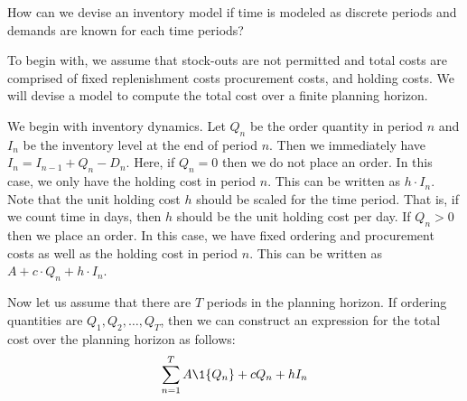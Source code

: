 \begin{exercise}
How can we devise an inventory model if time is modeled as discrete periods and demands are known for each time periods?


\begin{solution}
To begin with, we assume that stock-outs are not permitted and total costs are comprised of fixed replenishment costs procurement costs, and holding costs. We will devise a model to compute the total cost over a finite planning horizon.

We begin with inventory dynamics. Let $Q_n$ be the order quantity in period $n$ and $I_n$ be the inventory level at the end of period $n$. Then we immediately have $I_n=I_{n-1}+Q_n-D_n$. Here, if $Q_n=0$ then we do not place an order. In this case, we only have the holding cost in period $n$. This can be written as $h\cdot I_n$. Note that the unit holding cost $h$ should be scaled for the time period. That is, if we count time in days, then $h$ should be the unit holding cost per day. If $Q_n>0$ then we place an order. In this case, we have fixed ordering and procurement costs as well as the holding cost in period $n$. This can be written as $A+c\cdot Q_n+h\cdot I_n$.

Now let us assume that there are $T$ periods in the planning horizon. If ordering quantities are $Q_1,Q_2,\ldots,Q_T$, then we can construct an expression for the total cost over the planning horizon as follows:
\begin{align*}
\sum_{n=1}^T A \1{Q_n} + c Q_n + hI_n
\end{align*}
\end{solution}
\end{exercise}

